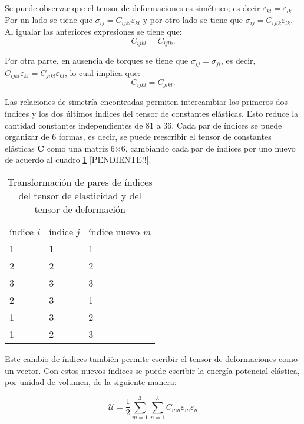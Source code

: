 \documentclass[12pt]{article}
\begin{document}
Se puede observar que el tensor de deformaciones es simétrico; es decir $\varepsilon_{kl} = \varepsilon_{lk}$. Por un lado se tiene que $\sigma_{ij} = C_{ijkl}\varepsilon_{kl}$ y por otro lado se tiene que $\sigma_{ij} = C_{ijlk}\varepsilon_{lk}$. Al igualar las anteriores expresiones se tiene que:
\begin{equation}
	C_{ijkl} = C_{ijlk}.
\end{equation}

Por otra parte, en ausencia de torques se tiene que $\sigma_{ij} = \sigma_{ji}$, es decir, $C_{ijkl}\varepsilon_{kl} = C_{jikl}\varepsilon_{kl}$, lo cual implica que: 
\begin{equation}
	C_{ijkl} = C_{jikl}.
\end{equation}

Las relaciones de simetría encontradas permiten intercambiar los primeros dos índices y los dos últimos indices del tensor de constantes elásticas. Esto reduce la cantidad constantes independientes de 81 a 36. Cada par de índices se puede organizar de 6 formas, es decir, se puede reescribir el tensor de constantes elásticas $\bm{C}$ como una matriz 6$\times$6, cambiando cada par de índices por uno nuevo de acuerdo al cuadro \ref{tab:my-table} [PENDIENTE!!].

\begin{table}[H]
	\centering
	\begin{tabular}{lll}
	índice \textit{i} & índice \textit{j} & índice nuevo \textit{m} \\
	1 & 1 & 1            \\
	2 & 2 & 2            \\
	3 & 3 & 3            \\
	2 & 3 & 1            \\
	1 & 3 & 2            \\
	1 & 2 & 3           
	\end{tabular}
	\caption{Transformación de pares de índices del tensor de elasticidad y del tensor de deformación}
	\label{tab:my-table}
\end{table}

Este cambio de índices también permite escribir el tensor de deformaciones como un vector. Con estos nuevos índices se puede escribir la energía potencial elástica, por unidad de volumen, de la siguiente manera: 

\begin{equation}
	\mathcal{U} = \frac{1}{2} \sum_{m=1}^{3}{\sum_{n=1}^{3}{C_{mn}\varepsilon_{m}\varepsilon_{n}}}
	\label{eq:u_vol}
\end{equation}
\end{document}
